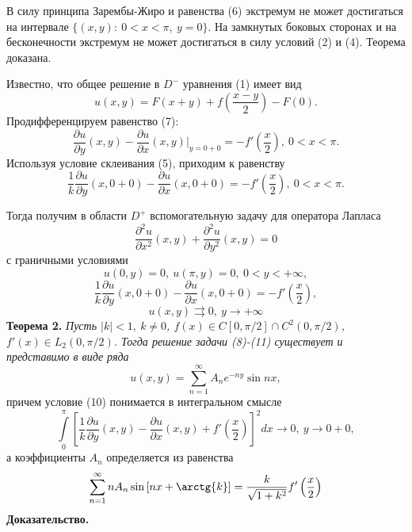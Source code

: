 \documentclass[9pt]{article}
\begin{document}
	В силу принципа Зарембы-Жиро и равенства (6) экстремум не может достигаться на интервале $\{(x,y):\ 0 < x < \pi, \ y = 0\}$. На замкнутых боковых сторонах и на бесконечности экстремум не может достигаться в силу условий (2) и (4). Теорема доказана.
	
	Известно, что общее решение в $D^{-}$  уравнения (1) имеет вид 
	\begin{equation}
		u(x,y) = F(x+y) + f(\dfrac{x-y}{2}) - F(0).
	\end{equation}
	Продифференцируем равенство (7):
	\begin{equation*}
		\dfrac{\partial u}{\partial y}(x,y) - \dfrac{\partial u}{\partial x}(x,y) \vert_{y=0+0} = -f'\left(\dfrac{x}2\right), \ 0 < x < \pi.
	\end{equation*}
	Используя условие склеивания (5), приходим к равенству
	\begin{equation*}
		\dfrac{1}{k} \dfrac{\partial u}{\partial y}(x, 0+0) - \dfrac{\partial u}{\partial x}(x, 0 + 0) = - f'\left(\dfrac{x}2\right), \ 0 < x < \pi. 
	\end{equation*}
	
	Тогда получим в области $D^{+}$ вспомогательную задачу для оператора Лапласа 
	\begin{equation}
		\dfrac{\partial^2 u}{\partial x^2}(x,y) + \dfrac{\partial^2 u}{\partial y^2}(x,y) = 0
	\end{equation}
	с граничными условиями 
	\begin{equation}
		u(0,y) = 0, \ u(\pi, y) = 0, \ 0 < y < +\infty, 
	\end{equation}
	\begin{equation}
		\dfrac{1}{k} \dfrac{\partial u}{\partial y}(x,0+0) - \dfrac{\partial u}{\partial x}(x,0+0) = -f'\left(\dfrac{x}{2}\right),
	\end{equation}
	\begin{equation}
		u(x,y) \rightrightarrows 0, \ y \to +\infty 
	\end{equation}
	\textbf{Теорема 2.} \textit{Пусть $|k| < 1, \ k \neq 0$, $f(x) \in C[0, \pi/2] \cap C^2(0, \pi/2)$, $f'(x) \in L_2(0, \pi/2)$. Тогда решение задачи (8)-(11) существует и представимо в виде ряда
	\begin{equation}
		u(x,y) = \sum\limits_{n=1}^{\infty} A_n e^{-ny} \sin{nx},
		\end{equation}}
	причем условие (10) понимается в интегральном смысле
	\begin{equation*}
		\int\limits_0^\pi \left[	\dfrac{1}{k} \dfrac{\partial u}{\partial y}(x,y) - \dfrac{\partial u}{\partial x}(x,y) + f'\left(\dfrac{x}{2}\right)\right]^2 dx \to 0, \ y \to 0 + 0,
	\end{equation*}
	а коэффициенты $A_n$ определяется из равенства
	\begin{equation}
		\sum\limits_{n=1}^{\infty} n A_n \sin{\left[nx + \arctg{k}\right]} = \dfrac{k}{\sqrt{1 + k^2}} f'\left(\dfrac{x}{2}\right) 
	\end{equation}
	\textbf{Доказательство.} 
	
\end{document}
